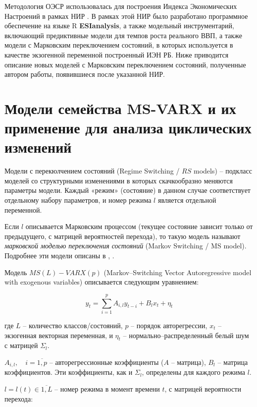 \documentclass[../report.tex]{subfiles}
\begin{document}
	Методология ОЭСР использовалась для построения Индекса Экономических Настроений в рамках НИР \cite{esiMaking}. В рамках этой НИР было разработано программное обеспечение на языке R \textbf{ESIanalysis}, а также модельный инструментарий, включающий предиктивные модели для темпов роста реального ВВП, а также модели с Марковским переключением состояний, в которых используется в качестве экзогенной переменной построенный ИЭН РБ. Ниже приводится описание новых моделей с Марковским переключением состояний, полученные автором работы, появившиеся после указанной НИР.
	
	
	\section{Модели семейства MS-VARX и их применение для анализа циклических изменений}
	
	Модели с перекюлчением состояний (Regime Switching / $RS$ models) – подкласс моделей со структурными изменениями в которых скачкообразно меняются параметры модели. Каждый «режим» (состояние) в данном случае соответствует отдельному набору параметров, и номер режима $l$ является отдельной переменной.
	
	Если $l$ описывается Марковским процессом (текущее состояние зависит только от предыдущего, с матрицей вероятностей перехода), то такую модель называют \textit{марковской моделью переключения состояний} (Markov Switching / MS model). Подробнее эти модели описаны в \cite{malNovopMSVARX}, \cite{mal_methods_nonconstant}.
	
	Модель $MS(L)-VARX(p)$ (Markov–Switching Vector Autoregressive model with exogenous variables) описывается следующим уравнением:
	
	\begin{equation}
	y_{t}=\sum_{i=1}^{p} A_{i,l} y_{t-i} + B_{l} x_{t} + \eta_{t}
	\end{equation}
	
	где $L$ – количество классов/состояний, $p$ – порядок авторегрессии, $x_{t}$ – экзогенная векторная переменная, и $\eta_{t}$ – нормально–распределенный белый шум с матрицей $\Sigma_{l}$.
	
	$A_{i,l}, \quad i = \overline{1,p} $ – авторегрессионные коэффициенты ($A$ – матрица), $B_{l}$ – матрица коэффициентов. Эти коэффициенты, как и $\Sigma_{l}$, определены для каждого режима $l$.
	
	$l=l(t) \in \overline{1,L}$ – номер режима в момент времени $t$, с матрицей вероятности перехода:
	
\end{document}
